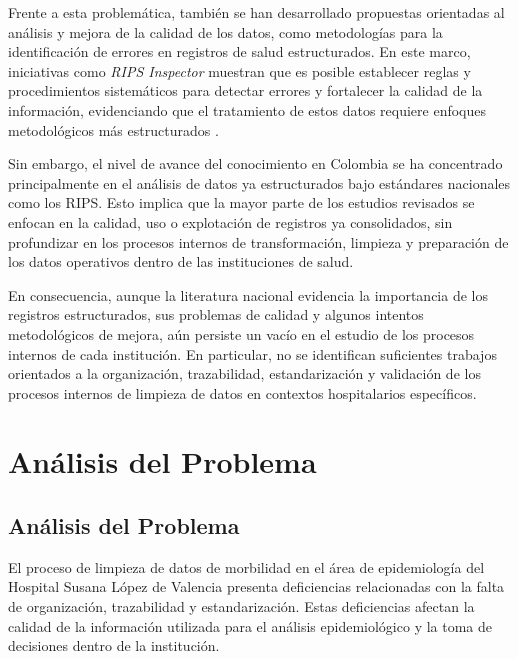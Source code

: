 \documentclass[12pt, letterpaper, oneside]{article}
\begin{document}
Frente a esta problemática, también se han desarrollado propuestas orientadas al análisis y mejora de la calidad de los datos, como metodologías para la identificación de errores en registros de salud estructurados. En este marco, iniciativas como \textit{RIPS Inspector} muestran que es posible establecer reglas y procedimientos sistemáticos para detectar errores y fortalecer la calidad de la información, evidenciando que el tratamiento de estos datos requiere enfoques metodológicos más estructurados \parencite{bohorquez_desarrollo_2024}.

Sin embargo, el nivel de avance del conocimiento en Colombia se ha concentrado principalmente en el análisis de datos ya estructurados bajo estándares nacionales como los RIPS. Esto implica que la mayor parte de los estudios revisados se enfocan en la calidad, uso o explotación de registros ya consolidados, sin profundizar en los procesos internos de transformación, limpieza y preparación de los datos operativos dentro de las instituciones de salud.

En consecuencia, aunque la literatura nacional evidencia la importancia de los registros estructurados, sus problemas de calidad y algunos intentos metodológicos de mejora, aún persiste un vacío en el estudio de los procesos internos de cada institución. En particular, no se identifican suficientes trabajos orientados a la organización, trazabilidad, estandarización y validación de los procesos internos de limpieza de datos en contextos hospitalarios específicos.

\newpage


\section{Análisis del Problema}

\subsection{Análisis del Problema}

El proceso de limpieza de datos de morbilidad en el área de epidemiología del Hospital Susana López de Valencia presenta deficiencias relacionadas con la falta de organización, trazabilidad y estandarización. Estas deficiencias afectan la calidad de la información utilizada para el análisis epidemiológico y la toma de decisiones dentro de la institución.
\end{document}
